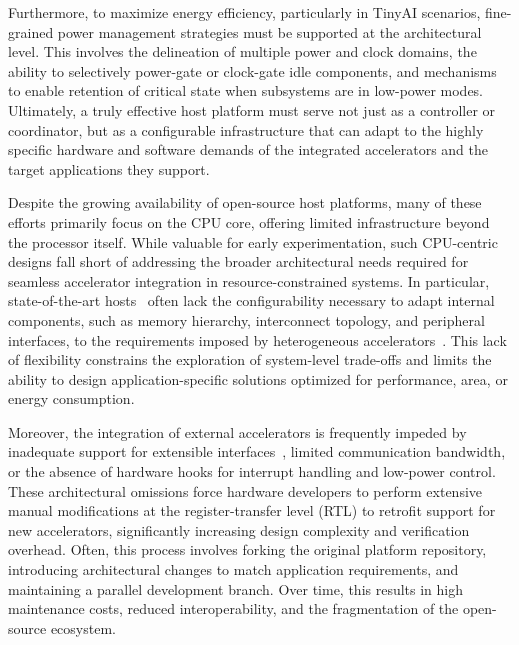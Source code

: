         Furthermore, to maximize energy efficiency, particularly in TinyAI scenarios, fine-grained power management strategies must be supported at the architectural level. This involves the delineation of multiple power and clock domains, the ability to selectively power-gate or clock-gate idle components, and mechanisms to enable retention of critical state when subsystems are in low-power modes. Ultimately, a truly effective host platform must serve not just as a controller or coordinator, but as a configurable infrastructure that can adapt to the highly specific hardware and software demands of the integrated accelerators and the target applications they support.

        Despite the growing availability of open-source host platforms, many of these efforts primarily focus on the CPU core, offering limited infrastructure beyond the processor itself. While valuable for early experimentation, such CPU-centric designs fall short of addressing the broader architectural needs required for seamless accelerator integration in resource-constrained systems. In particular, state-of-the-art hosts~\cite{pulpissimo, opentitan, blackparrot} often lack the configurability necessary to adapt internal components, such as memory hierarchy, interconnect topology, and peripheral interfaces, to the requirements imposed by heterogeneous accelerators~\cite{e-gpu, asip, oe-cgra, blade}. This lack of flexibility constrains the exploration of system-level trade-offs and limits the ability to design application-specific solutions optimized for performance, area, or energy consumption.

        Moreover, the integration of external accelerators is frequently impeded by inadequate support for extensible interfaces~\cite{blackparrot, chipyard, opentitan}, limited communication bandwidth, or the absence of hardware hooks for interrupt handling and low-power control. These architectural omissions force hardware developers to perform extensive manual modifications at the register-transfer level (RTL) to retrofit support for new accelerators, significantly increasing design complexity and verification overhead. Often, this process involves forking the original platform repository, introducing architectural changes to match application requirements, and maintaining a parallel development branch. Over time, this results in high maintenance costs, reduced interoperability, and the fragmentation of the open-source ecosystem.

